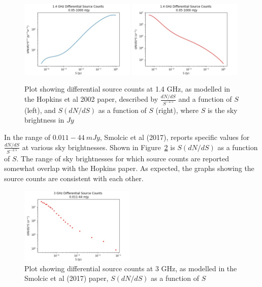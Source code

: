 \documentclass[letterpaper, 10pt]{article}
\begin{document}
\begin{figure}[h]
\begin{center}
\includegraphics[width=0.49\textwidth]{Hopkins1.jpg}
\includegraphics[width=0.49\textwidth]{Hopkins2.jpg}
\caption{Plot showing differential source counts at 1.4 GHz, as modelled in the Hopkins et al 2002 paper, described by $\frac{dN/dS}{S^{-2.5}}$ and a function of $S$ (left), and $S\left(dN/dS\right)$ as a function of $S$ (right), where $S$ is the sky brightness in $Jy$}
\label{Hopkins1}
\end{center}
\end{figure}

In the range of $0.011-44\ mJy$, Smolcic et al (2017), reports specific values for $\frac{dN/dS}{S^{-2.5}}$ at various sky brightnesses. Shown in Figure~\ref{Smolcic} is $S\left(dN/dS\right)$ as a function of $S$. The range of sky brightnesses for which source counts are reported somewhat overlap with the Hopkins paper. As expected, the graphs showing the source counts are consistent with each other.

\begin{figure}[h]
\begin{center}
\includegraphics[width=0.49\textwidth]{Smolcic.jpg}
\caption{Plot showing differential source counts at 3 GHz, as modelled in the Smolcic et al (2017) paper, $S\left(dN/dS\right)$ as a function of $S$ }
\label{Smolcic}
\end{center}
\end{figure}
\end{document}
